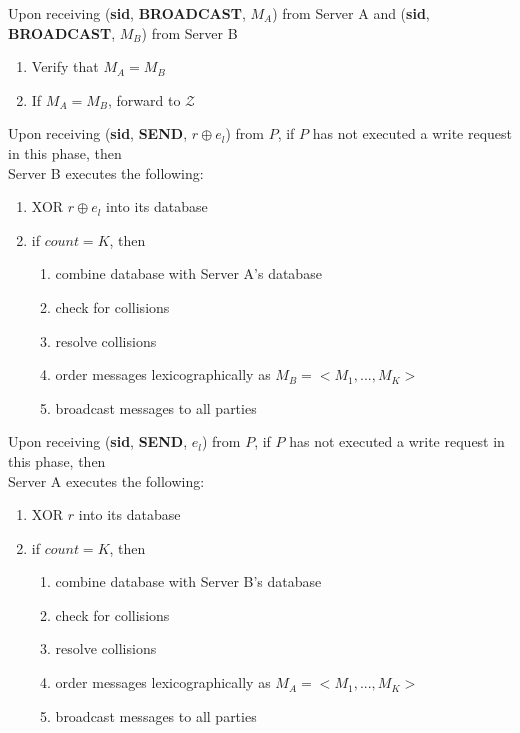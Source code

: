 \begin{tcolorbox}[colback=white, arc=5pt]
\extitem Upon receiving (\textbf{sid}, \textbf{BROADCAST}, $M_A$) from Server A and (\textbf{sid}, \textbf{BROADCAST}, $M_B$) from Server B
\begin{enumerate}
    \item Verify that $M_A = M_B$
    \item If $M_A = M_B$, forward to $\mathcal{Z}$
\end{enumerate}

\extitem Upon receiving (\textbf{sid}, \textbf{SEND}, $r\oplus e_l$) from $P$, if $P$ has not executed a write request in this phase, then \\
    Server B executes the following:
    
    \begin{enumerate}
        \item XOR $r\oplus e_l$ into its database  
        \item if $count=K$, then
        \begin{enumerate}
            \item combine database with Server A's database
            \item check for collisions
            \item resolve collisions
            \item order messages lexicographically as $M_B=<M_1,...,M_K>$
            \item broadcast messages to all parties
        \end{enumerate}
    \end{enumerate}

\extitem Upon receiving (\textbf{sid}, \textbf{SEND}, $e_l$) from $P$, if $P$ has not executed a write request in this phase, then \\
    Server A executes the following:
    \begin{enumerate}
        \item XOR $r$ into its database
        \item if $count=K$, then
        \begin{enumerate}
            \item combine database with Server B's database
            \item check for collisions
            \item resolve collisions
            \item order messages lexicographically as $M_A=<M_1,...,M_K>$
            \item broadcast messages to all parties
        \end{enumerate}
    \end{enumerate}
\end{tcolorbox}

\label{fig:riposte_protocol}